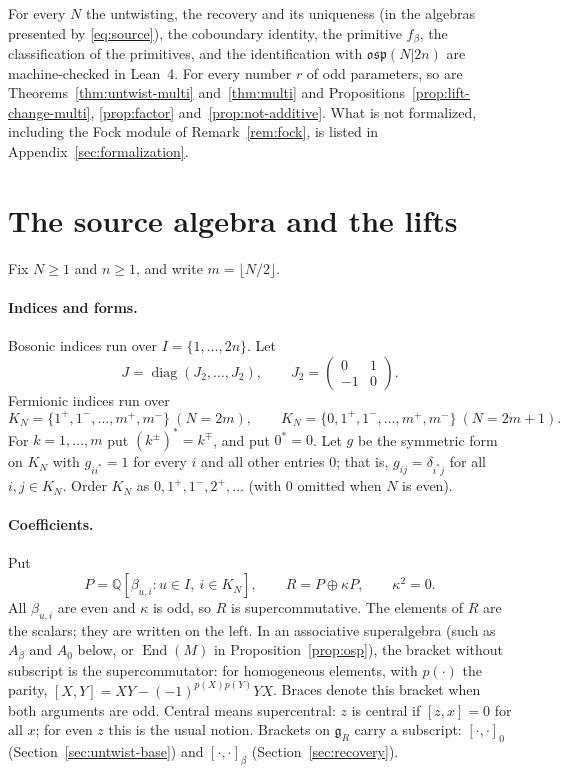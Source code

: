 \documentclass[11pt]{article}
\numberwithin{equation}{section}
\theoremstyle{definition}
\theoremstyle{remark}
\newcommand{\osp}{\mathfrak{osp}}
\begin{document}
For every $N$ the untwisting, the recovery and its uniqueness (in the algebras presented
by \eqref{eq:source}), the coboundary identity, the primitive $f_\beta$, the classification of the
primitives, and the identification with $\osp(N|2n)$ are machine-checked in Lean~4.
For every number $r$ of odd parameters, so are Theorems~\ref{thm:untwist-multi}
and~\ref{thm:multi} and Propositions~\ref{prop:lift-change-multi}, \ref{prop:factor} and~\ref{prop:not-additive}. What is not
formalized, including the Fock module of Remark~\ref{rem:fock}, is listed in
Appendix~\ref{sec:formalization}.

\section{The source algebra and the lifts}\label{sec:setting}

Fix $N\geq1$ and $n\geq1$, and write $m=\lfloor N/2\rfloor$.

\paragraph{Indices and forms.} Bosonic indices run over $I=\{1,\ldots,2n\}$. Let
\[
 J=\operatorname{diag}(J_2,\ldots,J_2),\qquad
 J_2=\begin{pmatrix}0&1\\-1&0\end{pmatrix}.
\]
Fermionic indices run over
\[
 K_N=\{1^+,1^-,\ldots,m^+,m^-\}\ (N=2m),\qquad
 K_N=\{0,1^+,1^-,\ldots,m^+,m^-\}\ (N=2m+1).
\]
For $k=1,\ldots,m$ put $(k^\pm)^*=k^\mp$, and put $0^*=0$. Let $g$ be the symmetric form on
$K_N$ with $g_{ii^*}=1$ for every $i$ and all other entries $0$; that is,
$g_{ij}=\delta_{i^*j}$ for all $i,j\in K_N$. Order $K_N$ as $0,1^+,1^-,2^+,\ldots$ (with $0$ omitted when $N$ is even).

\paragraph{Coefficients.} Put
\[
 P=\mathbb Q[\beta_{u,i}:u\in I,\ i\in K_N],\qquad
 R=P\oplus\kappa P,\qquad \kappa^2=0.
\]
All $\beta_{u,i}$ are even and $\kappa$ is odd, so $R$ is supercommutative.
The elements of $R$ are the scalars; they are written on the left. In an associative superalgebra (such as $A_\beta$
and $A_0$ below, or $\operatorname{End}(M)$ in Proposition~\ref{prop:osp}), the bracket without
subscript is the supercommutator: for homogeneous elements, with $p(\cdot)$ the
parity, $[X,Y]=XY-(-1)^{p(X)p(Y)}YX$. Braces denote this bracket when both arguments
are odd. Central means supercentral: $z$ is central if $[z,x]=0$ for all $x$; for even $z$ this
is the usual notion. Brackets on $\mathfrak g_R$ carry a subscript: $[\cdot,\cdot]_0$
(Section~\ref{sec:untwist-base}) and $[\cdot,\cdot]_\beta$ (Section~\ref{sec:recovery}).
\end{document}
